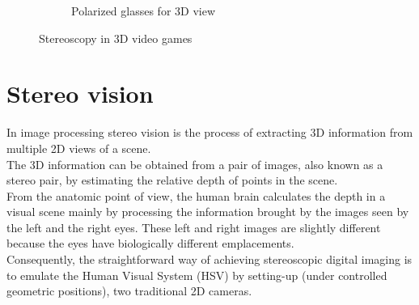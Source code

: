 \begin{figure}[h!]
\begin{subfigure}[]{0.4\textwidth}
                \caption{\scriptsize{Polarized glasses for 3D view}}
\end{subfigure} 
\caption{\small{Stereoscopy in 3D video games}}
\end{figure}

\section{Stereo vision}
In image processing stereo vision is the process of extracting 3D information from multiple 2D views of a scene. \\
The 3D information can be obtained from a pair of images, also known as a stereo pair, by estimating the relative depth of points in the scene.\\
From the anatomic point of view, the human brain calculates the depth in a visual scene mainly by
processing the information brought by the images seen by the left and the right eyes. These left and right images are slightly different because the eyes have biologically different emplacements.\\
Consequently, the straightforward way of achieving stereoscopic digital imaging is to emulate the
Human Visual System (HSV) by setting-up (under controlled geometric positions), two traditional 2D
cameras.\\

